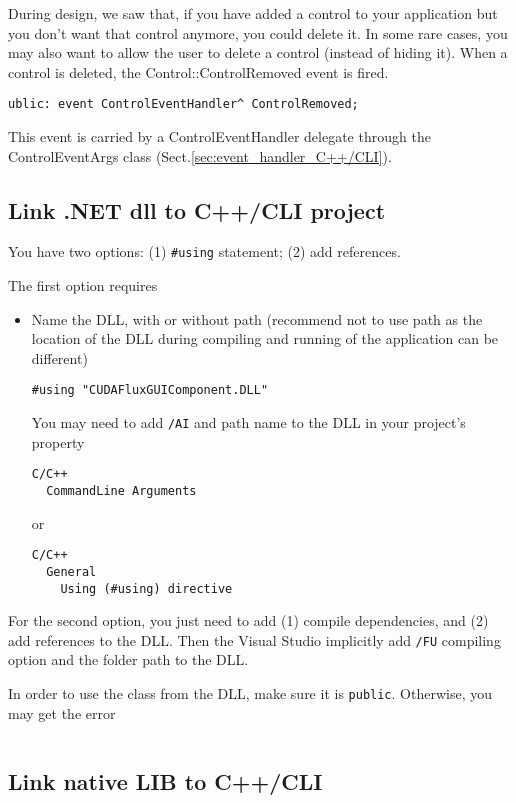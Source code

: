 During design, we saw that, if you have added a control to your application but
you don't want that control anymore, you could delete it. In some rare cases,
you may also want to allow the user to delete a control (instead of hiding it).
When a control is deleted, the Control::ControlRemoved event is fired.   

\begin{verbatim}
ublic: event ControlEventHandler^ ControlRemoved;
\end{verbatim}
This event is carried by a ControlEventHandler delegate through the
ControlEventArgs class (Sect.\ref{sec:event_handler_C++/CLI}).

\subsection{Link .NET dll to C++/CLI project}

You have two options: (1) \verb!#using! statement; (2) add references.

The first option requires
\begin{itemize}
  \item Name the DLL, with or without path (recommend not to use path as the
  location of the DLL during compiling and running of the application can be
  different)
  
\begin{verbatim}
#using "CUDAFluxGUIComponent.DLL"
\end{verbatim}
You may need to add \verb!/AI! and path name to the DLL in your project's
property
\begin{verbatim}
C/C++
  CommandLine Arguments
\end{verbatim}
or 
\begin{verbatim}
C/C++
  General
    Using (#using) directive
\end{verbatim}
\end{itemize}

For the second option, you just need to add (1) compile dependencies, and (2)
add references to the DLL. Then the Visual Studio implicitly add \verb!/FU!
compiling option and the folder path to the DLL. 

In order to use the class from the DLL, make sure it is \verb!public!.
Otherwise, you may get the error
\begin{verbatim}

\end{verbatim}

\subsection{Link native LIB to C++/CLI}


